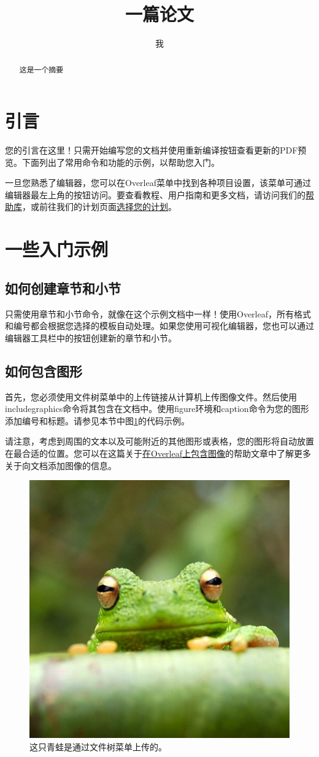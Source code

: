 \documentclass{article}
\title{一篇论文}
\author{我}
\begin{document}
\maketitle

\begin{abstract}
这是一个摘要
\end{abstract}

\section{引言}

您的引言在这里！只需开始编写您的文档并使用重新编译按钮查看更新的PDF预览。下面列出了常用命令和功能的示例，以帮助您入门。

一旦您熟悉了编辑器，您可以在Overleaf菜单中找到各种项目设置，该菜单可通过编辑器最左上角的按钮访问。要查看教程、用户指南和更多文档，请访问我们的\href{https://www.overleaf.com/learn}{帮助库}，或前往我们的计划页面\href{https://www.overleaf.com/user/subscription/plans}{选择您的计划}。

\section{一些入门示例}

\subsection{如何创建章节和小节}

只需使用章节和小节命令，就像在这个示例文档中一样！使用Overleaf，所有格式和编号都会根据您选择的模板自动处理。如果您使用可视化编辑器，您也可以通过编辑器工具栏中的按钮创建新的章节和小节。

\subsection{如何包含图形}

首先，您必须使用文件树菜单中的上传链接从计算机上传图像文件。然后使用includegraphics命令将其包含在文档中。使用figure环境和caption命令为您的图形添加编号和标题。请参见本节中图\ref{fig:frog}的代码示例。

请注意，考虑到周围的文本以及可能附近的其他图形或表格，您的图形将自动放置在最合适的位置。您可以在这篇关于\href{https://www.overleaf.com/learn/how-to/Including_images_on_Overleaf}{在Overleaf上包含图像}的帮助文章中了解更多关于向文档添加图像的信息。

\begin{figure}
\centering
\includegraphics[width=0.25\linewidth]{frog.jpg}
\caption{\label{fig:frog}这只青蛙是通过文件树菜单上传的。}
\end{figure}
\end{document}

